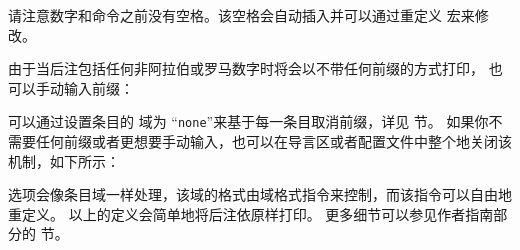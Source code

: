 \begin{ltxexample}
\cite[\ppno~27~sq.]{key}
\cite[\ppno~55~sqq.]{key}
\end{ltxexample}
%
请注意数字和命令之前没有空格。该空格会自动插入并可以通过重定义  宏来修改。

\begin{ltxexample}
\cite[27\psq]{key}
\cite[55\psqq]{key}
\end{ltxexample}
%
由于当后注包括任何非阿拉伯或罗马数字时将会以不带任何前缀的方式打印，
也可以手动输入前缀：

\begin{ltxexample}
\cite[p.~5]{key}
\end{ltxexample}
%
可以通过设置条目的  域为 “\texttt{none}”来基于每一条目取消前缀，详见  节。
如果你不需要任何前缀或者更想要手动输入，也可以在导言区或者配置文件中整个地关闭该机制，如下所示：

\begin{ltxexample}
\end{ltxexample}
%
 选项会像条目域一样处理，该域的格式由域格式指令来控制，而该指令可以自由地重定义。
以上的定义会简单地将后注依原样打印。
更多细节可以参见作者指南部分的  节。

